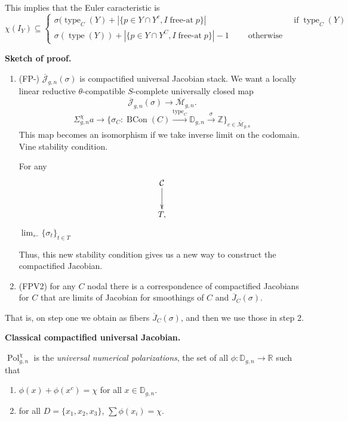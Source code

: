 This implies that the Euler caracteristic is
$$
\chi(I_Y)
\subseteq
\begin{cases}
\sigma(\operatorname{type}_C(Y)
+|\{p \in Y \cap
Y^c,I\operatorname{free-at}p\}|\qquad &
\operatorname{if} \operatorname{type}_C(Y)\\
\sigma(\operatorname{type}(Y))
+|\{p\in Y \cap
Y^C,I\operatorname{free-at}p\}|-1\qquad
\operatorname{otherwise}&
\end{cases}
$$

\medskip\noindent
{\bf Sketch of proof.}

\begin{enumerate}
\item (FP-) $\overline{\mathcal{J}}_{g,n}(\sigma)$
is compactified universal Jacobian
stack. We want a locally linear reductive
$\theta$-compatible $S$-complete universally
closed map
$$
\overline{\mathcal{J}}_{g,n}(\sigma)
\to
\overline{\mathcal{M}}_{g,n}.
$$
$$
\Sigma_{g,n}^{\chi}
a\to\{\sigma_C:
\operatorname{BCon}(C)\xrightarrow{\operatorname{type}_C}
\mathbb{D}_{g,n}\xrightarrow{\sigma}
\mathbb{Z}\}_{c \in
\overline{\mathcal{M}}_{g,n}}
$$
This map becomes an isomorphism if we take
inverse limit on the codomain.
Vine stability condition.

For any
$$
\xymatrix{
\mathcal{C}\ar[d]\\ T,
}
$$
$\lim_{\leftarrow} \{\sigma_t\}_{t \in T}$

Thus, this new stability condition gives us
a new way to construct the compactified
Jacobian.

\item (FPV2) for any $C$ nodal there is a
correspondence of compactified Jacobians
for $C$ that are limits of Jacobian for
smoothings of $C$ and
$\overline{J}_C(\sigma)$.

\end{enumerate}

That is, on step one we obtain as fibers
$\overline{J}_C(\sigma)$, and then
we use those in step 2.

\medskip\noindent
{\bf Classical compactified universal
Jacobian.}

\begin{definition}
\label{definition-universal-num-polariztns}
$\operatorname{Pol}_{g,n}^{\chi}$
is the {\it universal numerical
polarizations}, the set of all
$\phi:\mathbb{D}_{g,n} \to \mathbb{R}$ such
that
\begin{enumerate}
\item $\phi(x) + \phi(x^c) = \chi$
for all $x \in \mathbb{D}_{g,n}$.
\item for all $D=\{x_1,x_2,x_3\}$,
$\sum\phi(x_i)=\chi$.
\end{enumerate}
\end{definition}

